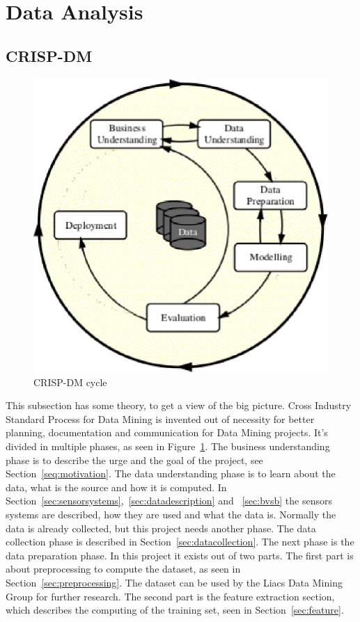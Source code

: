 \section{Data Analysis}
	\subsection{CRISP-DM}
	\label{sec:datamodeling}
	\begin{figure}[h]
		\centering
		\includegraphics[scale=0.75]{crispdm.eps}
					
		\caption{CRISP-DM\cite{wirth2000crisp} cycle}
		\label{fig:crispdm}

	\end{figure}
	This subsection has some theory, to get a view of the big picture. Cross Industry Standard Process for Data Mining\cite{wirth2000crisp} is invented out of necessity for better planning, documentation and communication for Data Mining projects. It's divided in multiple phases, as seen in Figure~\ref{fig:crispdm}. The business understanding phase is to describe the urge and the goal of the project, see Section~\ref{seq:motivation}. The data understanding phase is to learn about the data, what is the source and how it is computed. In Section~\ref{sec:sensorsystems},~\ref{sec:datadescription} and ~\ref{sec:bvsb} the sensors systems are described, how they are used and what the data is. Normally the data is already collected, but this project needs another phase. The data collection phase is described in Section~\ref{sec:datacollection}. The next phase is the data preparation phase. In this project it exists out of two parts. The first part is about preprocessing to compute the dataset, as seen in Section~\ref{sec:preprocessing}. The dataset can be used by the Liacs Data Mining Group for further research. The second part is the feature extraction section, which describes the computing of the training set, seen in Section~\ref{sec:feature}. 
